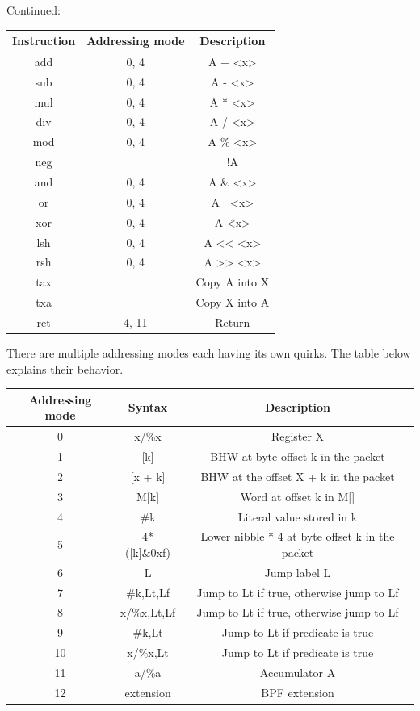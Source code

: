 \newpage
\noindent
Continued:
\begin{center}
 \begin{tabular}{||c c c||} 
 \hline
 Instruction & Addressing mode & Description \\ [0.5ex] 
 \hline\hline
  add & 0, 4 & A + <x> \\
  \hline
  sub & 0, 4 & A - <x> \\
  \hline
  mul & 0, 4 & A * <x> \\
  \hline
  div & 0, 4 & A / <x> \\
  \hline
  mod & 0, 4 & A \% <x> \\
  \hline
  neg & & !A \\
  \hline
  and & 0, 4 & A \& <x> \\
  \hline
  or & 0, 4 & A | <x> \\
  \hline
  xor & 0, 4 & A \^ <x> \\
  \hline
  lsh &  0, 4 & A << <x> \\
  \hline
  rsh & 0, 4 & A >> <x> \\
  \hline
  tax & & Copy A into X \\
  \hline
  txa & & Copy X into A \\
  \hline
  \hline
  ret & 4, 11 & Return \\
  \hline
\end{tabular}
\end{center}

\newpage
There are multiple addressing modes each having its own quirks. The table below explains their behavior.
\begin{center}
 \begin{tabular}{||c c c||} 
 \hline
   Addressing mode & Syntax & Description  \\ [0.5ex] 
 \hline\hline
   0 & x/\%x & Register X \\
   \hline
   1 & [k] & BHW at byte offset k in the packet \\
   \hline
   2 & [x + k] & BHW at the offset X + k in the packet \\
   \hline
   3 & M[k] & Word at offset k in M[] \\
   \hline
   4 & \#k & Literal value stored in k \\
   \hline
   5 & 4*([k]\&0xf) & Lower nibble * 4 at byte offset k in the packet \\
   \hline
   6 & L & Jump label L \\
   \hline
   7 & \#k,Lt,Lf & Jump to Lt if true, otherwise jump to Lf \\
   \hline
   8 & x/\%x,Lt,Lf & Jump to Lt if true, otherwise jump to Lf \\
   \hline
   9 & \#k,Lt & Jump to Lt if predicate is true \\
   \hline
  10 & x/\%x,Lt & Jump to Lt if predicate is true \\
   \hline
  11 & a/\%a & Accumulator A \\
   \hline
  12 & extension & BPF extension \\
   \hline
\end{tabular}
\end{center}

